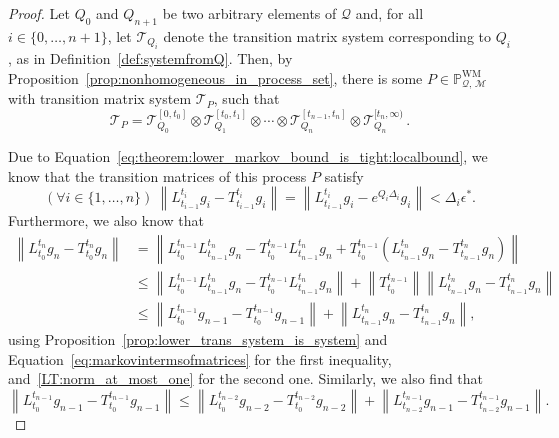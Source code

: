 \documentclass[10pt,a4paper]{paper}
\theoremstyle{definition}
\newcommand{\processes}{\mathbb{P}}
\newcommand{\wmprocesses}{\processes^{\mathrm{WM}}}
\newcommand{\rateset}{\mathcal{Q}}
\newcommand{\norm}[1]{\left\lVert #1 \right\rVert}
\begin{document}
\begin{proof}
Let $Q_0$ and $Q_{n+1}$ be two arbitrary elements of $\rateset$ and, for all $i\in\{0,\ldots,n+1\}$, let $\mathcal{T}_{Q_i}$ denote the transition matrix system corresponding to $Q_i$, as in Definition~\ref{def:systemfromQ}. Then, by Proposition~\ref{prop:nonhomogeneous_in_process_set}, there is some $P\in\wmprocesses_{\rateset,\,\mathcal{M}}$ with transition matrix system $\mathcal{T}_P$, such that
\begin{equation*}
\mathcal{T}_P = \mathcal{T}_{Q_0}^{[0,t_0]}\otimes \mathcal{T}_{Q_1}^{[t_0,t_1]}\otimes \cdots \otimes \mathcal{T}_{Q_n}^{[t_{n-1},t_n]} \otimes \mathcal{T}_{Q_n}^{[t_{n},\infty)}\,.
\end{equation*}

Due to Equation~\eqref{eq:theorem:lower_markov_bound_is_tight:localbound}, we know that the transition matrices of this process $P$ satisfy
\begin{equation}\label{eq:theorem:lower_markov_bound_is_tight:localbounds}
(\forall i\in\{1,\ldots,n\})~
\norm{L_{t_{i-1}}^{t_i}g_i - T_{t_{i-1}}^{t_i}g_i}= \norm{L_{t_{i-1}}^{t_i}g_i - e^{Q_i\Delta_i}g_i}<\Delta_i\epsilon^*.
\end{equation}
Furthermore, we also know that
\begin{align*}
\norm{L_{t_0}^{t_n}g_n - T_{t_0}^{t_n}g_n}
&=\norm{L_{t_0}^{t_{n-1}}L_{t_{n-1}}^{t_n}g_n - T_{t_0}^{t_{n-1}}L_{t_{n-1}}^{t_n}g_n+T_{t_0}^{t_{n-1}}(L_{t_{n-1}}^{t_n}g_n - T_{t_{n-1}}^{t_n}g_n)} \\ 
 &\leq \norm{L_{t_0}^{t_{n-1}}L_{t_{n-1}}^{t_n}g_n - T_{t_0}^{t_{n-1}}L_{t_{n-1}}^{t_n}g_n} + \norm{T_{t_0}^{t_{n-1}}}\norm{L_{t_{n-1}}^{t_n}g_n - T_{t_{n-1}}^{t_n}g_n} \\
 &\leq \norm{L_{t_0}^{t_{n-1}}g_{n-1} - T_{t_0}^{t_{n-1}}g_{n-1}} + \norm{L_{t_{n-1}}^{t_n}g_n - T_{t_{n-1}}^{t_n}g_n},
\end{align*}
using Proposition~\ref{prop:lower_trans_system_is_system} and Equation~\eqref{eq:markovintermsofmatrices} for the first inequality, and~\ref{LT:norm_at_most_one} for the second one.
Similarly, we also find that
\begin{equation*}
\norm{L_{t_0}^{t_{n-1}}g_{n-1} - T_{t_0}^{t_{n-1}}g_{n-1}}
\leq \norm{L_{t_0}^{t_{n-2}}g_{n-2} - T_{t_0}^{t_{n-2}}g_{n-2}} + \norm{L_{t_{n-2}}^{t_{n-1}}g_{n-1} - T_{t_{n-2}}^{t_{n-1}}g_{n-1}}.
\end{equation*}

\end{proof}
\end{document}

